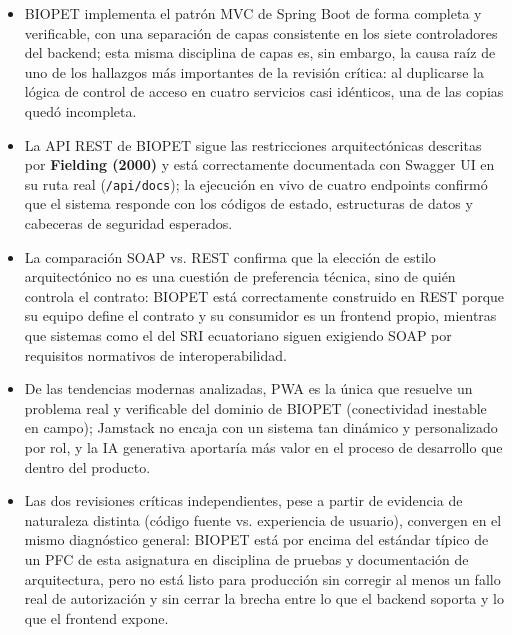 \documentclass[11pt,a4paper]{article}
\begin{document}
\begin{itemize}[leftmargin=*]
    \item BIOPET implementa el patrón MVC de Spring Boot de forma completa
    y verificable, con una separación de capas consistente en los siete
    controladores del backend; esta misma disciplina de capas es, sin
    embargo, la causa raíz de uno de los hallazgos más importantes de la
    revisión crítica: al duplicarse la lógica de control de acceso en
    cuatro servicios casi idénticos, una de las copias quedó incompleta.
    \item La API REST de BIOPET sigue las restricciones arquitectónicas
    descritas por \textbf{Fielding (2000)} y está correctamente documentada
    con Swagger UI en su ruta real (\texttt{/api/docs}); la ejecución en
    vivo de cuatro endpoints confirmó que el sistema responde con los
    códigos de estado, estructuras de datos y cabeceras de seguridad
    esperados.
    \item La comparación SOAP vs. REST confirma que la elección de estilo
    arquitectónico no es una cuestión de preferencia técnica, sino de quién
    controla el contrato: BIOPET está correctamente construido en REST
    porque su equipo define el contrato y su consumidor es un frontend
    propio, mientras que sistemas como el del SRI ecuatoriano siguen
    exigiendo SOAP por requisitos normativos de interoperabilidad.
    \item De las tendencias modernas analizadas, PWA es la única que
    resuelve un problema real y verificable del dominio de BIOPET
    (conectividad inestable en campo); Jamstack no encaja con un sistema
    tan dinámico y personalizado por rol, y la IA generativa aportaría más
    valor en el proceso de desarrollo que dentro del producto.
    \item Las dos revisiones críticas independientes, pese a partir de
    evidencia de naturaleza distinta (código fuente vs. experiencia de
    usuario), convergen en el mismo diagnóstico general: BIOPET está por
    encima del estándar típico de un PFC de esta asignatura en disciplina
    de pruebas y documentación de arquitectura, pero no está listo para
    producción sin corregir al menos un fallo real de autorización y sin
    cerrar la brecha entre lo que el backend soporta y lo que el frontend
    expone.
\end{itemize}

\end{document}
